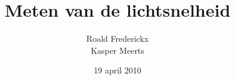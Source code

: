 \documentclass[11pt,a4paper]{article}
\author{Roald Frederickx\\Kasper Meerts}
\title{Meten van de lichtsnelheid}
\date{19 april 2010}
\begin{document}
\graphicspath{{"./afbeeldingen/"}}
\maketitle






\end{document}
